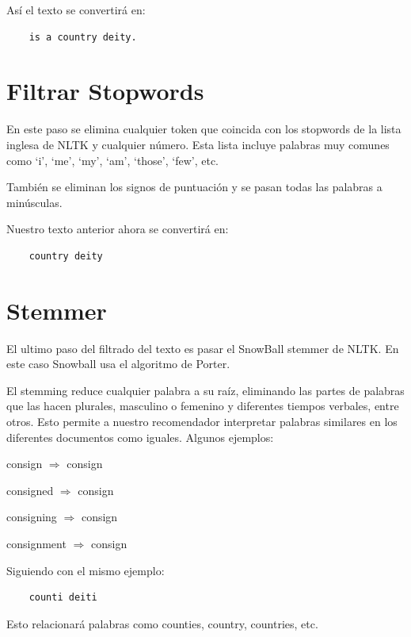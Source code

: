 \documentclass[withindex, glossary]{cam-thesis}
\begin{document}
Así el texto se convertirá en:
\begin{verbatim}
    is a country deity.
\end{verbatim}

\section{Filtrar Stopwords}
En este paso se elimina cualquier token que coincida con los stopwords de la lista inglesa de NLTK\cite{NLTK} y cualquier número. Esta lista incluye palabras muy comunes como `i', `me', `my', `am', `those', `few', etc.

También se eliminan los signos de puntuación y se pasan todas las palabras a minúsculas.


Nuestro texto anterior ahora se convertirá en:
\begin{verbatim}
    country deity
\end{verbatim}

\section{Stemmer}
El ultimo paso del filtrado del texto es pasar el SnowBall\cite{snowball} stemmer de NLTK\cite{NLTK}\@. En este caso Snowball usa el algoritmo de Porter\cite{porter}.

El stemming reduce cualquier palabra a su raíz, eliminando las partes de palabras que las hacen plurales, masculino o femenino y  diferentes tiempos verbales, entre otros. Esto permite a nuestro recomendador interpretar palabras similares en los diferentes documentos como iguales. Algunos ejemplos:

\begin{center}
consign $\Rightarrow$ consign

consigned $\Rightarrow$ consign

consigning $\Rightarrow$ consign

consignment $\Rightarrow$ consign
\end{center}

Siguiendo con el mismo ejemplo:
\begin{verbatim}
    counti deiti
\end{verbatim}

Esto relacionará palabras como counties, country, countries, etc.
\end{document}

